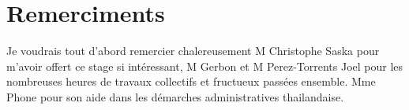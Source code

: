 \chapter*{Remerciments}
Je voudrais tout d'abord remercier chalereusement M Christophe Saska pour m'avoir offert ce stage si intéressant, M Gerbon et M Perez-Torrents Joel pour les nombreuses heures de travaux collectifs et fructueux passées ensemble. Mme Phone pour son aide dans les démarches administratives thailandaise.
